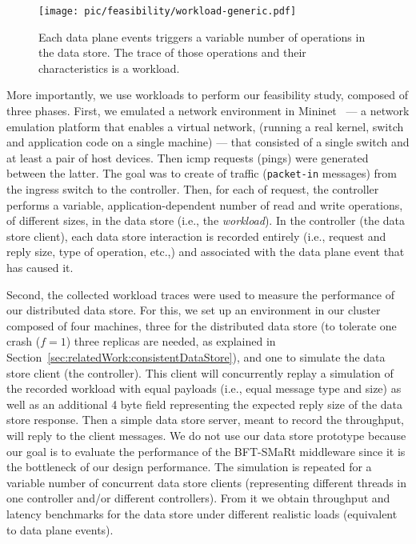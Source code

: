 \begin{figure}[ht]
  \centering
  \texttt{[image: pic/feasibility/workload-generic.pdf]}   
  \caption[Workload definition]{Each data plane events triggers a variable number of operations in the data store. The trace of those operations and their characteristics is a workload.}
  \label{fig:feasibility:workloads}
\end{figure}

More importantly, we use workloads to perform our feasibility study, composed of three phases. 
First, we emulated a network environment in Mininet~\cite{Handigol:2012tg} --- a network emulation platform that enables a virtual network, (running a real kernel, switch and application code on a single machine) ---  that consisted of a single switch and at least a pair of host devices.
Then \gls{icmp} requests (pings) were generated between the latter. 
The goal was to create \gls{of}  traffic (\texttt{packet-in} messages) from the ingress switch to the controller.
Then, for each \gls{of} request, the controller performs a variable, application-dependent number of read and write operations, of different sizes, in the data store (i.e., the \textit{workload}). 
In the controller (the data store client),  each data store interaction is recorded entirely (i.e., request and reply size, type of operation, etc.,) and associated with the data plane event that has caused it. 

Second, the collected workload traces were used to measure the performance of our distributed data store.
For this, we set up an environment in our cluster composed of four machines, three for the distributed data store (to tolerate one crash ($f=1$) three replicas are needed, as explained in Section~\ref{sec:relatedWork:consistentDataStore}), and one to simulate the data store client (the controller). 
This client will concurrently replay a simulation of the recorded workload with equal payloads (i.e., equal message type and size) as well as an additional 4 byte field representing the expected reply size of the data store response. 
Then a simple data store server, meant to record the throughput, will reply to the client messages. 
We do not use our data store prototype  because our  goal is to evaluate the performance of the BFT-SMaRt middleware since it is the bottleneck of our design performance. 
The simulation is repeated for a variable number of concurrent data store clients (representing different threads in one controller and/or different controllers).
From it we obtain throughput and latency benchmarks for the data store under different realistic loads (equivalent to data plane events).  

